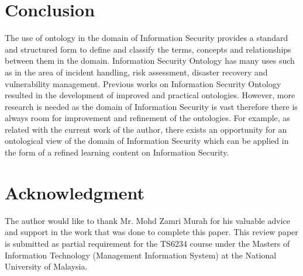 \documentclass[conference, compsoc]{IEEEtran}
\begin{document}



\section{Conclusion}
The use of ontology in the domain of Information Security provides a standard and structured form to define and classify the terms, concepts and relationships between them in the domain. Information Security Ontology has many uses such as in the area of incident handling, risk assessment, disaster recovery and vulnerability management. Previous works on Information Security Ontology resulted in the development of improved and practical ontologies. However, more research is needed as the domain of Information Security is vast therefore there is always room for improvement and refinement of the ontologies. For example, as related with the current work of the author, there exists an opportunity for an ontological view of the domain of Information Security which can be applied in the form of a refined learning content on Information Security.



\section*{Acknowledgment}


The author would like to thank Mr. Mohd Zamri Murah for his valuable advice and support in the work that was done to complete this paper. This review paper is submitted as partial requirement for the TS6234 course under the Masters of Information Technology (Management Information System) at the National University of Malaysia.

\newpage
\end{document}
